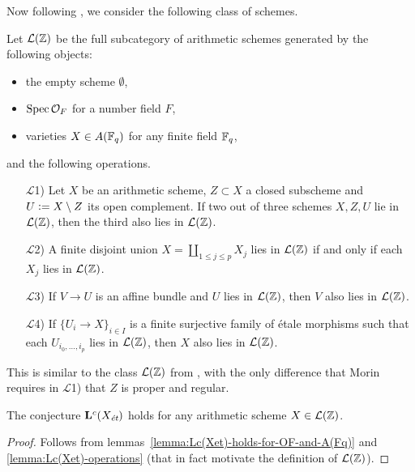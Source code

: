 \documentclass{article}
\numberwithin{equation}{section}
\begin{document}
Now following \cite{Morin-2014}, we consider the following class of schemes.

\begin{definition}
  Let $\mathcal{L} (\ZZ)$ be the full subcategory of arithmetic schemes
  generated by the following objects:
  \begin{itemize}
  \item the empty scheme $\emptyset$,
  \item $\Spec \mathcal{O}_F$ for a number field $F$,
  \item varieties $X \in A (\FF_q)$ for any finite field $\FF_q$,
  \end{itemize}
  and the following operations.
  \begin{enumerate}
  \item[$\mathcal{L}$1)] Let $X$ be an arithmetic scheme, $Z \subset X$ a closed
    subscheme and $U \dfn X\setminus Z$ its open complement. If two out of three
    schemes $X,Z,U$ lie in $\mathcal{L} (\ZZ)$, then the third also lies in
    $\mathcal{L} (\ZZ)$.

  \item[$\mathcal{L}$2)] A finite disjoint union
    $X = \coprod_{1 \le j \le p} X_j$ lies in $\mathcal{L} (\ZZ)$ if and only if
    each $X_j$ lies in $\mathcal{L} (\ZZ)$.

  \item[$\mathcal{L}$3)] If $V \to U$ is an affine bundle and $U$ lies in
    $\mathcal{L} (\ZZ)$, then $V$ also lies in $\mathcal{L} (\ZZ)$.

  \item[$\mathcal{L}$4)] If $\{ U_i \to X \}_{i \in I}$ is a finite surjective
    family of étale morphisms such that each $U_{i_0,\ldots,i_p}$ lies in
    $\mathcal{L} (\ZZ)$, then $X$ also lies in $\mathcal{L} (\ZZ)$.
  \end{enumerate}
\end{definition}

This is similar to the class $\mathcal{L} (\ZZ)$ from
\cite[Definition~5.9]{Morin-2014}, with the only difference that Morin requires
in $\mathcal{L}$1) that $Z$ is proper and regular.

\begin{proposition}
  The conjecture $\mathbf{L}^c (X_\et)$ holds for any arithmetic scheme
  $X \in \mathcal{L} (\ZZ)$.

  \begin{proof}
    Follows from lemmas~\ref{lemma:Lc(Xet)-holds-for-OF-and-A(Fq)} and
    \ref{lemma:Lc(Xet)-operations} (that in fact motivate the definition of
    $\mathcal{L} (\ZZ)$).
  \end{proof}
\end{proposition}
\end{document}
